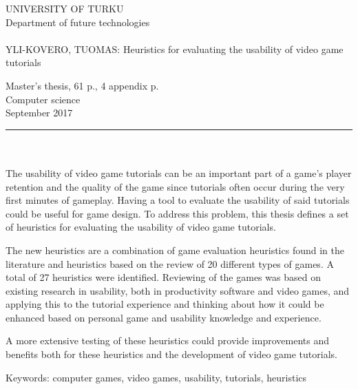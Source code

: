 \documentclass[12pt, a4paper]{report}
\begin{document}
\begin{minipage}{15cm}
	\pagestyle{empty}
	\noindent
	UNIVERSITY OF TURKU\\
	Department of future technologies\\
	\\
	YLI-KOVERO, TUOMAS: Heuristics for evaluating the usability of video game tutorials
	
	Master's thesis, 61 p., 4 appendix p.\\
	Computer science\\
	September 2017\\
	\rule{\textwidth}{.2mm}\\
	\\
	The usability of video game tutorials can be an important part of a game's player retention and the quality of the game since tutorials often occur during the very first minutes of gameplay. Having a tool to evaluate the usability of said tutorials could be useful for game design. To address this problem, this thesis defines a set of heuristics for evaluating the usability of video game tutorials.
	
	\vspace{4mm}\noindent The new heuristics are a combination of game evaluation heuristics found in the literature and heuristics based on the review of 20 different types of games. A total of 27 heuristics were identified. Reviewing of the games was based on existing research in usability, both in productivity software and video games, and applying this to the tutorial experience and thinking about how it could be enhanced based on personal game and usability knowledge and experience.
	
	\vspace{4mm}\noindent A more extensive testing of these heuristics could provide improvements and benefits both for these heuristics and the development of video game tutorials. 
	
	\vspace{4mm}\noindent Keywords: computer games, video games, usability, tutorials, heuristics
	
\end{minipage}
\end{document}
